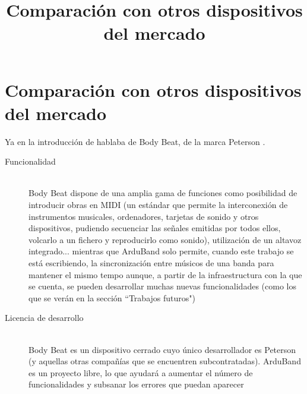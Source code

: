 \section{Comparación con otros dispositivos del mercado}
\title{Comparación con otros dispositivos del mercado}
Ya en la introducción de hablaba de Body Beat, de la marca Peterson \cite{bodybeat}.\\

\begin{description}
  \item[Funcionalidad] \hfill \\
    Body Beat dispone de una amplia gama de funciones como posibilidad de introducir
    obras en MIDI (un estándar que permite la interconexión de instrumentos musicales,
    ordenadores, tarjetas de sonido y otros dispositivos, pudiendo secuenciar las señales
    emitidas por todos ellos, volcarlo a un fichero y reproducirlo como sonido), utilización
    de un altavoz integrado... mientras que ArduBand solo permite, cuando este trabajo
    se está escribiendo, la sincronización entre músicos de una banda para mantener
    el mismo tempo aunque, a partir de la infraestructura con la que se cuenta, se pueden
    desarrollar muchas nuevas funcionalidades (como los que se verán en la sección ``Trabajos futuros")

  \item[Licencia de desarrollo] \hfill \\
    Body Beat es un dispositivo cerrado cuyo único desarrollador es Peterson (y aquellas otras
    compañías que se encuentren subcontratadas). ArduBand es un proyecto libre, lo que
    ayudará a aumentar el número de funcionalidades y subsanar los errores que puedan aparecer


\end{description}

